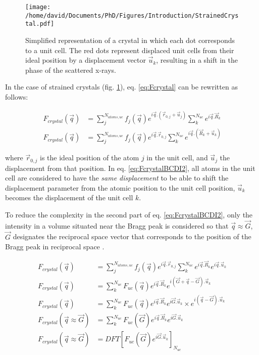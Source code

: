\begin{figure}[!htb]
    \centering
    \texttt{[image: /home/david/Documents/PhD/Figures/Introduction/StrainedCrystal.pdf]}
    \caption{
    Simplified representation of a crystal in which each dot corresponds to a unit cell.
    The red dots represent displaced unit cells from their ideal position by a displacement vector $\vec{u}_k$, resulting in a shift in the phase of the scattered x-rays.
    }
    \label{fig:StrainedCrystals}
\end{figure}

In the case of strained crystals (fig. \ref{fig:StrainedCrystals}), eq. \ref{eq:Fcrystal} can be rewritten as follows:

\begin{align}
    \label{eq:FcrystalBCDI1}
    F_{crystal}(\vec{q}) & = \sum_j^{N_{atoms, uc}} f_j(\vec{q}) e^{i\vec{q}.(\vec{r}_{0,j} + \vec{u}_{j})} \sum_k^{N_{uc}} e^{i\vec{q}.\vec{R}_k}\\
    \label{eq:FcrystalBCDI2}
    F_{crystal}(\vec{q}) & = \sum_j^{N_{atoms, uc}} f_j(\vec{q}) e^{i\vec{q}.\vec{r}_{0,j}} \sum_k^{N_{uc}} e^{i\vec{q}.(\vec{R}_k + \vec{u}_{k})}
\end{align}

where $\vec{r}_{0,j}$ is the ideal position of the atom $j$ in the unit cell, and $\vec{u}_{j}$ the displacement from that position.
In eq. \ref{eq:FcrystalBCDI2}, all atoms in the unit cell are considered to have the \textit{same displacement} to be able to shift the displacement parameter from the atomic position to the unit cell position, $\vec{u}_{k}$ becomes the displacement of the unit cell $k$.

To reduce the complexity in the second part of eq. \ref{eq:FcrystalBCDI2}, only the intensity in a volume situated near the Bragg peak is considered so that $\vec{q} \approx \vec{G}$, $\vec{G}$ designates the reciprocal space vector that corresponds to the position of the Bragg peak in reciprocal space \parencite{Pfeifer2006, Minkevich2007, Harder2007}.

\begin{align}
    \label{eq:FcrystalBCDI3}
    F_{crystal}(\vec{q}) & = \sum_j^{N_{atoms, uc}} f_j(\vec{q}) e^{i\vec{q}.\vec{r}_{0,j}} \sum_k^{N_{uc}} e^{i\vec{q}.\vec{R}_k} e^{i\vec{q}.\vec{u}_k}\\
    \label{eq:FcrystalBCDI4}
    F_{crystal}(\vec{q}) & = \sum_k^{N_{uc}} F_{uc}(\vec{q}) e^{i\vec{q}.\vec{R}_k} e^{i(\vec{G}+\vec{q}-\vec{G}).\vec{u}_k}\\
    \label{eq:FcrystalBCDI5}
    F_{crystal}(\vec{q}) & = \sum_k^{N_{uc}} F_{uc}(\vec{q}) e^{i\vec{q}.\vec{R}_k} e^{i\vec{G}.\vec{u}_k} \times e^{i(\vec{q}-\vec{G}).\vec{u}_k}\\
    \label{eq:FcrystalBCDI6}
    F_{crystal}(\vec{q} \approx \vec{G}) & = \sum_k^{N_{uc}} F_{uc}(\vec{G}) e^{i\vec{q}.\vec{R}_k} e^{i\vec{G}.\vec{u}_k}\\
    \label{eq:FcrystalBCDI7}
    F_{crystal}(\vec{q} \approx \vec{G}) & = DFT[ F_{uc}(\vec{G}) e^{i\vec{G}.\vec{u}_k}]_{N_{uc}}
\end{align}


